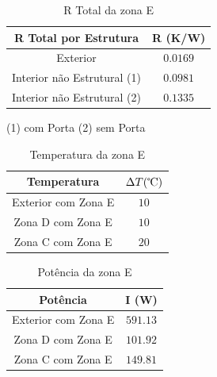 \documentclass[12pt, a4paper]{article}
\begin{document}
\vspace{10mm}

\begin{table}[htpb]
	\begin{center}
		\begin{tabular}{c c}
			\toprule
			R Total por Estrutura									 & 	R (K/W)  \\
			\midrule
			 Exterior			               				         & $0.0169$		 \\
			 Interior n\~ao Estrutural (1)            	 & $0.0981$		 \\
			 Interior n\~ao Estrutural (2)         		 & $0.1335$		 \\
			\bottomrule
		\end{tabular}
	\end{center}
	\begin{center}
		(1) com Porta
		(2) sem Porta
	\end{center}
	\caption{R Total da zona E}\label{tab:seccaoEtotal}
\end{table}

\vspace{10mm}

\begin{table}[htpb]
	\begin{center}
		\begin{tabular}{c c}
			\toprule
			Temperatura    										 & 	$\Delta T(\celsius)$   \\
			\midrule
			 Exterior	com Zona E		               	     & $10$	 \\
			 Zona D com Zona E             	   			 & $10$		 \\
			 Zona C com Zona E          					 & $20$		 \\
			\bottomrule
		\end{tabular}
	\end{center}
	\caption{Temperatura da zona E}\label{tab:seccaoEtemp}
\end{table}

\pagebreak

\begin{table}[htpb]
	\begin{center}
		\begin{tabular}{c c}
			\toprule
			Potência   										 & 	I (W) \\
			\midrule
			 Exterior	com Zona E		               	     & $591.13$	     \\
			 Zona D com Zona E             	   			 & $101.92$		 \\
			 Zona C com Zona E          					 & $149.81$		 \\
			\bottomrule
		\end{tabular}
	\end{center}
	\caption{Potência da zona E}\label{tab:1seccaoEpot}
\end{table}
\end{document}
